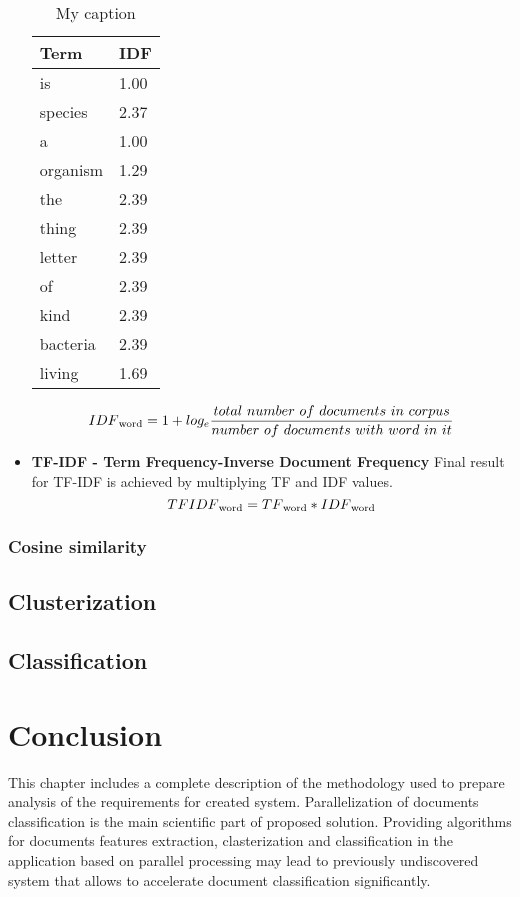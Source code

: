 \begin{itemize}
	
	\begin{table}[H]
		\centering
		\caption{My caption}
		\label{my-label}
		\begin{tabular}{@{}ll@{}}
			\toprule
			Term     & IDF  \\ \midrule
			is       & 1.00 \\
			species  & 2.37 \\
			a        & 1.00 \\
			organism & 1.29 \\
			the      & 2.39 \\
			thing    & 2.39 \\
			letter   & 2.39 \\
			of       & 2.39 \\
			kind     & 2.39 \\
			bacteria & 2.39 \\
			living   & 1.69 \\ \bottomrule
		\end{tabular}
	\end{table}
	
		\[IDF\textsubscript{word}=1+log_e \frac{total\ number\ of\ documents\ in\ corpus}{number\ of\ documents\ with\ word\ in\ it}\]

	\item \textbf{TF-IDF - Term Frequency-Inverse Document Frequency}
	Final result for TF-IDF is achieved by multiplying TF and IDF values.
	\[TFIDF\textsubscript{word}=TF\textsubscript{word} * IDF\textsubscript{word}\]
\end{itemize}

\subsubsection{Cosine similarity}

\subsection{Clusterization}

\subsection{Classification}

\section{Conclusion}
This chapter includes a complete description of the methodology used to prepare analysis of the requirements for created system. Parallelization of documents classification is the main scientific part of proposed solution. Providing algorithms for documents features extraction, clasterization and classification in the application based on parallel processing may lead to previously undiscovered system that allows to accelerate document classification significantly. 